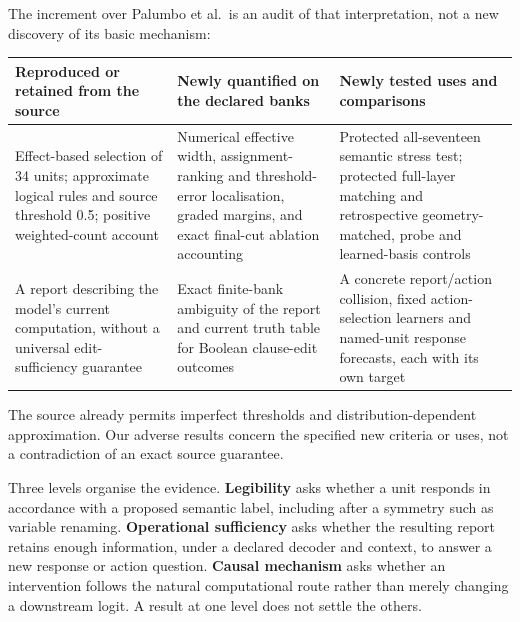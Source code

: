 \documentclass[
  british,
  11pt,
  a4paper,
]{article}
\newcounter{none} %
\begin{document}
The increment over Palumbo et al.~is an audit of that interpretation,
not a new discovery of its basic mechanism:

{\def\LTcaptype{none} %
\begin{longtable}[]{@{}
  >{\raggedright\arraybackslash}p{}
  >{\raggedright\arraybackslash}p{}
  >{\raggedright\arraybackslash}p{}@{}}
\toprule\noalign{}
\begin{minipage}[b]{\linewidth}\raggedright
Reproduced or retained from the source
\end{minipage} & \begin{minipage}[b]{\linewidth}\raggedright
Newly quantified on the declared banks
\end{minipage} & \begin{minipage}[b]{\linewidth}\raggedright
Newly tested uses and comparisons
\end{minipage} \\
\midrule\noalign{}
\endhead
\bottomrule\noalign{}
\endlastfoot
Effect-based selection of 34 units; approximate logical rules and source
threshold 0.5; positive weighted-count account & Numerical effective
width, assignment-ranking and threshold-error localisation, graded
margins, and exact final-cut ablation accounting & Protected
all-seventeen semantic stress test; protected full-layer matching and
retrospective geometry-matched, probe and learned-basis controls \\
A report describing the model's current computation, without a universal
edit-sufficiency guarantee & Exact finite-bank ambiguity of the report
and current truth table for Boolean clause-edit outcomes & A concrete
report/action collision, fixed action-selection learners and named-unit
response forecasts, each with its own target \\
\end{longtable}
}

The source already permits imperfect thresholds and
distribution-dependent approximation. Our adverse results concern the
specified new criteria or uses, not a contradiction of an exact source
guarantee.

Three levels organise the evidence. \textbf{Legibility} asks whether a
unit responds in accordance with a proposed semantic label, including
after a symmetry such as variable renaming. \textbf{Operational
sufficiency} asks whether the resulting report retains enough
information, under a declared decoder and context, to answer a new
response or action question. \textbf{Causal mechanism} asks whether an
intervention follows the natural computational route rather than merely
changing a downstream logit. A result at one level does not settle the
others.
\end{document}
